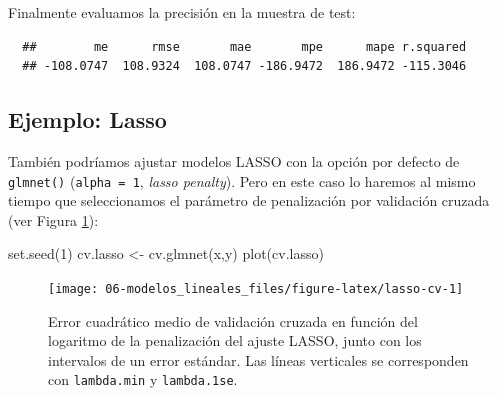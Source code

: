 \documentclass[
]{book}
\newenvironment{Shaded}{\begin{snugshade}}{\end{snugshade}}
\newcommand{\AttributeTok}[1]{\textcolor[rgb]{0.77,0.63,0.00}{#1}}
\newcommand{\CommentTok}[1]{\textcolor[rgb]{0.56,0.35,0.01}{\textit{#1}}}
\newcommand{\DecValTok}[1]{\textcolor[rgb]{0.00,0.00,0.81}{#1}}
\newcommand{\FunctionTok}[1]{\textcolor[rgb]{0.00,0.00,0.00}{#1}}
\newcommand{\NormalTok}[1]{#1}
\newcommand{\OtherTok}[1]{\textcolor[rgb]{0.56,0.35,0.01}{#1}}
\newcommand{\SpecialCharTok}[1]{\textcolor[rgb]{0.00,0.00,0.00}{#1}}
\theoremstyle{break}
\theoremstyle{nonumberplain}
\renewcommand{\CommentTok}[1]{\textcolor[rgb]{0.41,0.41,0.41}{\texttt{#1}}}
\begin{document}
Finalmente evaluamos la precisión en la muestra de test:

\begin{Shaded}
\end{Shaded}

\begin{verbatim}
  ##        me      rmse       mae       mpe      mape r.squared 
  ## -108.0747  108.9324  108.0747 -186.9472  186.9472 -115.3046
\end{verbatim}

\hypertarget{ejemplo-lasso}{%
\subsection{Ejemplo: Lasso}\label{ejemplo-lasso}}

También podríamos ajustar modelos LASSO con la opción por defecto de \texttt{glmnet()} (\texttt{alpha\ =\ 1}, \emph{lasso penalty}).
Pero en este caso lo haremos al mismo tiempo que seleccionamos el parámetro de penalización por validación cruzada (ver Figura \ref{fig:lasso-cv}):



\begin{Shaded}
\begin{Highlighting}[]
\FunctionTok{set.seed}\NormalTok{(}\DecValTok{1}\NormalTok{)}
\NormalTok{cv.lasso }\OtherTok{\textless{}{-}} \FunctionTok{cv.glmnet}\NormalTok{(x,y)}
\FunctionTok{plot}\NormalTok{(cv.lasso)}
\end{Highlighting}
\end{Shaded}

\begin{figure}[!htb]

{\centering \texttt{[image: 06-modelos\_lineales\_files/figure-latex/lasso-cv-1]} 

}

\caption{Error cuadrático medio de validación cruzada en función del logaritmo de la penalización del ajuste LASSO, junto con los intervalos de un error estándar. Las líneas verticales se corresponden con \texttt{lambda.min} y \texttt{lambda.1se}.}\label{fig:lasso-cv}
\end{figure}
\end{document}
